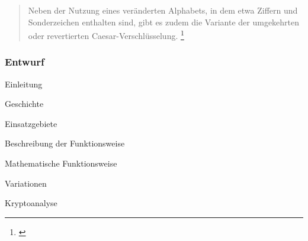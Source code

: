 \documentclass[11pt,paper=a4,final]{scrartcl}
\begin{document}
\begin{quote}
  \frqq Neben der Nutzung eines veränderten Alphabets, in dem etwa Ziffern und
  Sonderzeichen enthalten sind, gibt es zudem die Variante der umgekehrten oder
  revertierten Caesar-Verschlüsselung.\flqq
  \footnote{\cite{wiki:RSA-Kryptosystem}}
\end{quote}

\subsubsection{Entwurf}
\begin{enumerate*}
  \item Einleitung
  \item Geschichte
  \item Einsatzgebiete
  \item Beschreibung der Funktionsweise
  \item Mathematische Funktionsweise
  \item Variationen
  \item Kryptoanalyse
\end{enumerate*}
\end{document}
